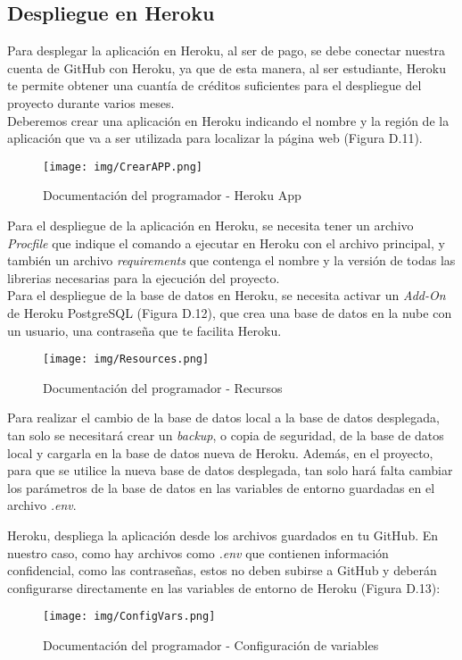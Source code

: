 \subsection{Despliegue en Heroku}
Para desplegar la aplicación en Heroku, al ser de pago, se debe conectar nuestra cuenta de GitHub con Heroku, ya que de esta manera, al ser estudiante, Heroku te permite obtener una cuantía de créditos suficientes para el despliegue del proyecto durante varios meses.\\
Deberemos crear una aplicación en Heroku indicando el nombre y la región de la aplicación que va a ser utilizada para localizar la página web (Figura D.11).
\begin{figure}[h!]
    \centering
    \texttt{[image: img/CrearAPP.png]} \\
    \caption{Documentación del programador - Heroku App}
    \label{Documentación del programador - Heroku App}
\end{figure}


Para el despliegue de la aplicación en Heroku, se necesita tener un archivo \textit{Procfile} que indique el comando a ejecutar en Heroku con el archivo principal, y también un archivo \textit{requirements} que contenga el nombre y la versión de todas las librerias necesarias para la ejecución del proyecto.\\
Para el despliegue de la base de datos en Heroku, se necesita activar un \textit{Add-On} de Heroku PostgreSQL (Figura D.12), que crea una base de datos en la nube con un usuario, una contraseña que te facilita Heroku.
\begin{figure}[h!]
    \centering
    \texttt{[image: img/Resources.png]} \\
    \caption{Documentación del programador - Recursos}
    \label{Documentación del programador - Recursos}
\end{figure}


Para realizar el cambio de la base de datos local a la base de datos desplegada, tan solo se necesitará crear un \textit{backup}, o copia de seguridad, de la base de datos local y cargarla en la base de datos nueva de Heroku. Además, en el proyecto, para que se utilice la nueva base de datos desplegada, tan solo hará falta cambiar los parámetros de la base de datos en las variables de entorno guardadas en el archivo \textit{.env}.


Heroku, despliega la aplicación desde los archivos guardados en tu GitHub. En nuestro caso, como hay archivos como \textit{.env} que contienen información confidencial, como las contraseñas, estos no deben subirse a GitHub y deberán configurarse directamente en las variables de entorno de Heroku (Figura D.13):\\
\begin{figure}[h!]
    \centering
    \texttt{[image: img/ConfigVars.png]} \\
    \caption{Documentación del programador - Configuración de variables}
    \label{Documentación del programador - Configuración de variables}
\end{figure}


